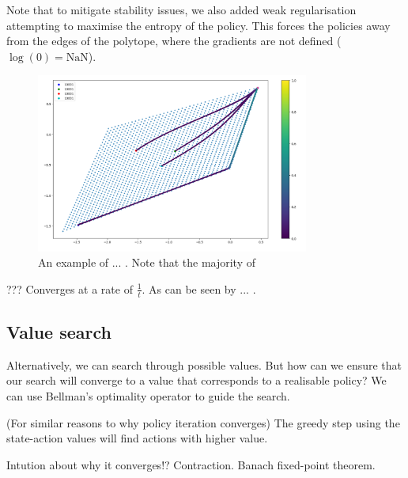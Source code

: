 Note that to mitigate stability issues, we also added weak regularisation
attempting to maximise the entropy of the policy. This forces the policies away
from the edges of the polytope, where the gradients are not defined ($\log(0) = \text{NaN}$).

\begin{figure}[h!]
\centering
\includegraphics[width=0.8\textwidth,height=0.4\textheight]{../../pictures/figures/pg-polytope.png}
\caption{An example of ... . Note that the majority of }
\end{figure}

{\color{red}??? Converges at a rate of $\frac{1}{t}$. As can be seen by ...}
\cite{Agarwal2019a}.

\newpage

\subsection{Value search}

Alternatively, we can search through possible values. But how can we ensure that our search will
converge to a value that corresponds to a realisable policy? We can use Bellman's
optimality operator to guide the search.

(For similar reasons to why policy iteration converges) The greedy step using the
state-action values will find actions with higher value.


Intution about why it converges!? Contraction. Banach fixed-point theorem.


